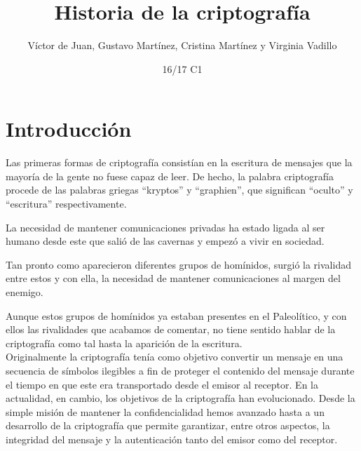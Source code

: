 \documentclass[nochap]{apuntesURJC}
\title{Historia de la criptografía}
\author{Víctor de Juan, Gustavo Martínez, Cristina Martínez y Virginia Vadillo}
\date{16/17 C1}
\begin{document}
\maketitle %

\setcounter{tocdepth}{3} %

\tableofcontents %
\newpage






\section{Introducción}
Las primeras formas de criptografía consistían en la escritura de mensajes que la mayoría de la gente no fuese capaz de leer. De hecho, la palabra criptografía procede de las palabras griegas ``kryptos'' y ``graphien'', que significan ``oculto'' y ``escritura'' respectivamente.

La necesidad de mantener comunicaciones privadas ha estado ligada al ser humano desde este que salió de las cavernas y empezó a vivir en sociedad.

Tan pronto como aparecieron diferentes grupos de homínidos, surgió la rivalidad entre estos y con ella, la necesidad de mantener comunicaciones al margen del enemigo.

Aunque estos grupos de homínidos ya estaban presentes en el Paleolítico, y con ellos las rivalidades que acabamos de comentar, no tiene sentido hablar de la criptografía como tal hasta la aparición de la escritura.\\


Originalmente la criptografía tenía como objetivo convertir un mensaje en una secuencia de símbolos ilegibles a fin de proteger el contenido del mensaje durante el tiempo en que este era transportado desde el emisor al receptor. En la actualidad, en cambio, los objetivos de la criptografía han evolucionado. Desde la simple misión de mantener la confidencialidad hemos avanzado hasta a un desarrollo de la criptografía que permite garantizar, entre otros aspectos, la integridad del mensaje y la autenticación tanto del emisor como del receptor.
\end{document}
